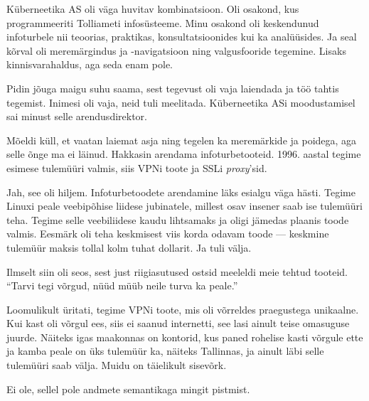 Küberneetika AS oli väga 
huvitav kombinatsioon. Oli osakond, kus programmeeriti Tolliameti 
infosüsteeme. Minu osakond oli keskendunud infoturbele nii teoorias, 
praktikas, konsultatsioonides kui ka analüüsides. Ja seal kõrval oli 
meremärgindus ja -navigatsioon ning valgusfooride tegemine. Lisaks
kinnisvarahaldus, aga seda enam pole. 
 

Pidin jõuga maigu suhu saama, sest tegevust oli vaja laiendada ja 
töö tahtis tegemist. Inimesi oli vaja, neid tuli meelitada. 
Küberneetika ASi moodustamisel sai minust selle
arendusdirektor. 

Mõeldi küll, et vaatan laiemat asja ning tegelen ka meremärkide 
ja poidega, aga selle õnge ma ei läinud. Hakkasin arendama infoturbetooteid. 1996. aastal tegime esimese tulemüüri valmis, siis 
VPNi toote ja SSLi \emph{proxy}'sid. 


Jah, see oli hiljem. Infoturbetoodete arendamine läks esialgu väga
hästi. Tegime Linuxi peale veebipõhise liidese 
jubinatele, millest osav insener saab ise tulemüüri teha. Tegime selle veebiliidese kaudu lihtsamaks ja oligi jämedas plaanis 
toode valmis. Eesmärk oli teha keskmisest viis korda odavam toode --- keskmine 
tulemüür maksis tollal kolm tuhat dollarit. Ja tuli välja. 

Ilmselt siin oli seos, sest just 
riigiasutused ostsid meeleldi meie tehtud tooteid. \enquote{Tarvi 
tegi võrgud, nüüd müüb neile turva ka peale.}


Loomulikult üritati, tegime 
VPNi toote, mis oli võrreldes praegustega unikaalne. Kui kast 
oli võrgul ees, siis ei saanud internetti, see lasi ainult teise omasuguse juurde. 
Näiteks igas maakonnas on kontorid, kus paned rohelise kasti võrgule ette ja kamba peale on üks tulemüür ka, näiteks Tallinnas, ja ainult läbi selle tulemüüri saab 
välja. Muidu on täielikult sisevõrk. 


Ei ole, sellel pole andmete semantikaga mingit pistmist. 

